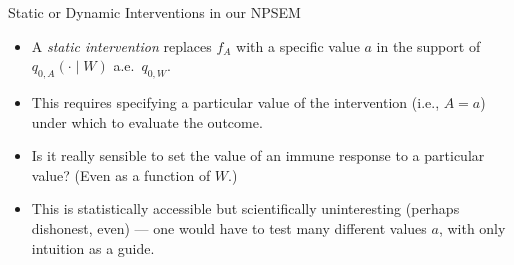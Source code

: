 \documentclass{beamer}
\begin{document}
\begin{frame}[c]{Static or Dynamic Interventions in our NPSEM}

\begin{center}
\begin{itemize}
  \itemsep10pt
  \item A \textit{static intervention} replaces $f_A$ with a specific value $a$
    in the support of $q_{0, A}(\cdot \mid W)$ a.e.~$q_{0,W}$.
  \item This requires specifying a particular value of the intervention (i.e.,
    $A = a$) under which to evaluate the outcome.
  \item Is it really sensible to set the value of an immune response to a
    particular value? (Even as a function of $W$.)
  \item This is statistically accessible but scientifically uninteresting
    (perhaps dishonest, even) --- one would have to test many different values
    $a$, with only intuition as a guide.
\end{itemize}
\end{center}


\end{frame}

\end{document}
